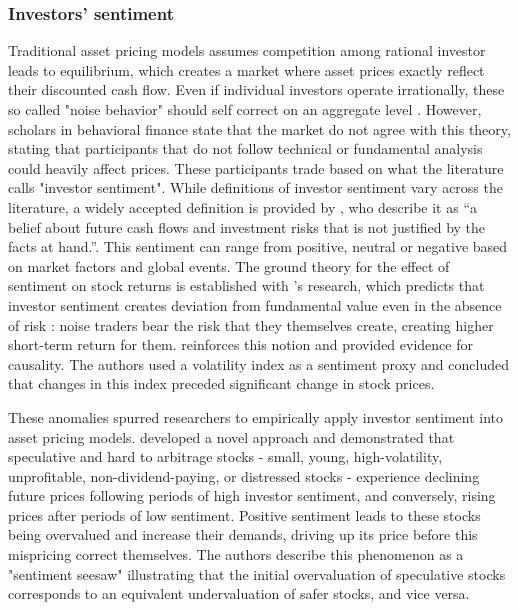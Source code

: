 \subsubsection{Investors' sentiment}


Traditional asset pricing models assumes competition among rational investor leads to equilibrium, which creates a market where asset prices exactly reflect their discounted cash flow. Even if individual investors operate irrationally, these so called "noise behavior" should self correct on an aggregate level \cite{friedman_1953}. However, scholars in behavioral finance state that the market do not agree with this theory, stating that participants that do not follow technical or fundamental analysis could heavily affect prices. These participants trade based on what the literature calls "investor sentiment". While definitions of investor sentiment vary across the literature, a widely accepted definition is provided by , who describe it as ``a belief about future cash flows and investment risks that is not justified by the facts at hand.''. This sentiment can range from positive, neutral or negative based on market factors and global events. The ground theory for the effect of sentiment on stock returns is established with 's research, which predicts that investor sentiment creates deviation from fundamental value even in the absence of risk : noise traders bear the risk that they themselves create, creating higher short-term return for them.  reinforces this notion and provided evidence for causality. The authors used a volatility index as a sentiment proxy and concluded that changes in this index preceded significant change in stock prices.


These anomalies spurred researchers to empirically apply investor sentiment into asset pricing models.  developed a novel approach and demonstrated that speculative and hard to arbitrage stocks - small, young, high-volatility, unprofitable, non-dividend-paying, or distressed stocks - experience declining future prices following periods of high investor sentiment, and conversely, rising prices after periods of low sentiment. Positive sentiment leads to these stocks being overvalued and increase their demands, driving up its price before this mispricing correct themselves. The authors describe this phenomenon as a "sentiment seesaw" illustrating that the initial overvaluation of speculative stocks corresponds to an equivalent undervaluation of safer stocks, and vice versa. 

